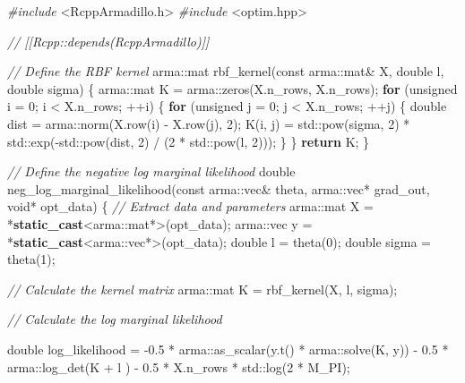 \documentclass[
]{article}
\newenvironment{Shaded}{\begin{snugshade}}{\end{snugshade}}
\newcommand{\AttributeTok}[1]{\textcolor[rgb]{0.77,0.63,0.00}{#1}}
\newcommand{\BuiltInTok}[1]{#1}
\newcommand{\CommentTok}[1]{\textcolor[rgb]{0.56,0.35,0.01}{\textit{#1}}}
\newcommand{\ControlFlowTok}[1]{\textcolor[rgb]{0.13,0.29,0.53}{\textbf{#1}}}
\newcommand{\DataTypeTok}[1]{\textcolor[rgb]{0.13,0.29,0.53}{#1}}
\newcommand{\DecValTok}[1]{\textcolor[rgb]{0.00,0.00,0.81}{#1}}
\newcommand{\FloatTok}[1]{\textcolor[rgb]{0.00,0.00,0.81}{#1}}
\newcommand{\ImportTok}[1]{#1}
\newcommand{\KeywordTok}[1]{\textcolor[rgb]{0.13,0.29,0.53}{\textbf{#1}}}
\newcommand{\NormalTok}[1]{#1}
\newcommand{\PreprocessorTok}[1]{\textcolor[rgb]{0.56,0.35,0.01}{\textit{#1}}}
\begin{document}
\begin{Shaded}
\begin{Highlighting}[]
\PreprocessorTok{\#include }\ImportTok{\textless{}RcppArmadillo.h\textgreater{}}
\PreprocessorTok{\#include }\ImportTok{\textless{}optim.hpp\textgreater{}}

\CommentTok{// [[Rcpp::depends(RcppArmadillo)]]}

\CommentTok{// Define the RBF kernel}
\NormalTok{arma::mat rbf\_kernel(}\AttributeTok{const}\NormalTok{ arma::mat\& X, }\DataTypeTok{double}\NormalTok{ l, }\DataTypeTok{double}\NormalTok{ sigma) \{}
\NormalTok{    arma::mat K = arma::zeros(X.n\_rows, X.n\_rows);}
    \ControlFlowTok{for}\NormalTok{ (}\DataTypeTok{unsigned}\NormalTok{ i = }\DecValTok{0}\NormalTok{; i \textless{} X.n\_rows; ++i) \{}
        \ControlFlowTok{for}\NormalTok{ (}\DataTypeTok{unsigned}\NormalTok{ j = }\DecValTok{0}\NormalTok{; j \textless{} X.n\_rows; ++j) \{}
            \DataTypeTok{double}\NormalTok{ dist = arma::norm(X.row(i) {-} X.row(j), }\DecValTok{2}\NormalTok{);}
\NormalTok{            K(i, j) = }\BuiltInTok{std::}\NormalTok{pow(sigma, }\DecValTok{2}\NormalTok{) * }\BuiltInTok{std::}\NormalTok{exp({-}}\BuiltInTok{std::}\NormalTok{pow(dist, }\DecValTok{2}\NormalTok{) / (}\DecValTok{2}\NormalTok{ * }\BuiltInTok{std::}\NormalTok{pow(l, }\DecValTok{2}\NormalTok{)));}
\NormalTok{        \}}
\NormalTok{    \}}
    \ControlFlowTok{return}\NormalTok{ K;}
\NormalTok{\}}

\CommentTok{// Define the negative log marginal likelihood}
\DataTypeTok{double}\NormalTok{ neg\_log\_marginal\_likelihood(}\AttributeTok{const}\NormalTok{ arma::vec\& theta, arma::vec* grad\_out, }\DataTypeTok{void}\NormalTok{* opt\_data) \{}
    \CommentTok{// Extract data and parameters}
\NormalTok{    arma::mat X = *}\KeywordTok{static\_cast}\NormalTok{\textless{}arma::mat*\textgreater{}(opt\_data);}
\NormalTok{    arma::vec y = *}\KeywordTok{static\_cast}\NormalTok{\textless{}arma::vec*\textgreater{}(opt\_data);}
    \DataTypeTok{double}\NormalTok{ l = theta(}\DecValTok{0}\NormalTok{);}
    \DataTypeTok{double}\NormalTok{ sigma = theta(}\DecValTok{1}\NormalTok{);}

    \CommentTok{// Calculate the kernel matrix}
\NormalTok{    arma::mat K = rbf\_kernel(X, l, sigma);}

    \CommentTok{// Calculate the log marginal likelihood}
    
    \DataTypeTok{double}\NormalTok{ log\_likelihood = {-}}\FloatTok{0.5}\NormalTok{ * arma::as\_scalar(y.t() * arma::solve(K, y)) {-} }\FloatTok{0.5}\NormalTok{ * arma::log\_det(K + l ) {-} }\FloatTok{0.5}\NormalTok{ * X.n\_rows * }\BuiltInTok{std::}\NormalTok{log(}\DecValTok{2}\NormalTok{ * M\_PI);}


\end{Highlighting}
\end{Shaded}
\end{document}
